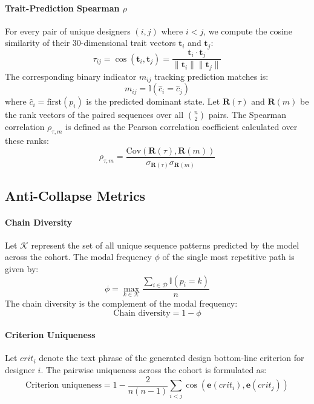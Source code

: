 \documentclass[11pt]{article}
\begin{document}
\paragraph{Trait-Prediction Spearman $\rho$}
For every pair of unique designers $(i, j)$ where $i < j$, we compute the cosine similarity of their 30-dimensional trait vectors $\mathbf{t}_i$ and $\mathbf{t}_j$:
\begin{equation}
\tau_{ij} = \cos(\mathbf{t}_i, \mathbf{t}_j) = \frac{\mathbf{t}_i \cdot \mathbf{t}_j}{\|\mathbf{t}_i\| \|\mathbf{t}_j\|}
\end{equation}
The corresponding binary indicator $m_{ij}$ tracking prediction matches is:
\begin{equation}
m_{ij} = \mathbb{I}(\hat{c}_i = \hat{c}_j)
\end{equation}
where $\hat{c}_i = \text{first}(p_i)$ is the predicted dominant state. Let $\mathbf{R}(\tau)$ and $\mathbf{R}(m)$ be the rank vectors of the paired sequences over all $\binom{n}{2}$ pairs. The Spearman correlation $\rho_{\tau, m}$ is defined as the Pearson correlation coefficient calculated over these ranks:
\begin{equation}
\rho_{\tau, m} = \frac{\text{Cov}(\mathbf{R}(\tau), \mathbf{R}(m))}{\sigma_{\mathbf{R}(\tau)} \sigma_{\mathbf{R}(m)}}
\end{equation}

\subsection{Anti-Collapse Metrics}

\paragraph{Chain Diversity}
Let $\mathcal{K}$ represent the set of all unique sequence patterns predicted by the model across the cohort. The modal frequency $\phi$ of the single most repetitive path is given by:
\begin{equation}
\phi = \max_{k \in \mathcal{K}} \frac{\sum_{i \in \mathcal{D}} \mathbb{I}(p_i = k)}{n}
\end{equation}
The chain diversity is the complement of the modal frequency:
\begin{equation}
\text{Chain diversity} = 1 - \phi
\end{equation}

\paragraph{Criterion Uniqueness}
Let $crit_i$ denote the text phrase of the generated design bottom-line criterion for designer $i$. The pairwise uniqueness across the cohort is formulated as:
\begin{equation}
\text{Criterion uniqueness} = 1 - \frac{2}{n(n-1)} \sum_{i < j} \cos(\mathbf{e}(crit_i), \mathbf{e}(crit_j))
\end{equation}
\end{document}

